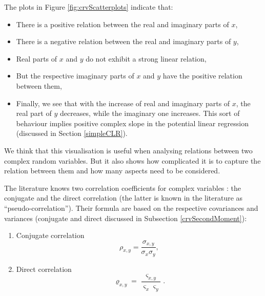 \documentclass[
]{book}
\providecommand{\tightlist}{%
  \setlength{\itemsep}{0pt}\setlength{\parskip}{0pt}}
\begin{document}
The plots in Figure \ref{fig:crvScatterplots} indicate that:

\begin{itemize}
\tightlist
\item
  There is a positive relation between the real and imaginary parts of \(x\),
\item
  There is a negative relation between the real and imaginary parts of \(y\),
\item
  Real parts of \(x\) and \(y\) do not exhibit a strong linear relation,
\item
  But the respective imaginary parts of \(x\) and \(y\) have the positive relation between them,
\item
  Finally, we see that with the increase of real and imaginary parts of \(x\), the real part of \(y\) decreases, while the imaginary one increases. This sort of behaviour implies positive complex slope in the potential linear regression (discussed in Section \ref{simpleCLR}).
\end{itemize}

We think that this visualisation is useful when analysing relations between two complex random variables. But it also shows how complicated it is to capture the relation between them and how many aspects need to be considered.

The literature knows two correlation coefficients for complex variables \citep{ref}: the conjugate and the direct correlation (the latter is known in the literature as ``pseudo-correlation''). Their formula are based on the respective covariances and variances (conjugate and direct discussed in Subsection \ref{crvSecondMoment}):

\begin{enumerate}
\def\labelenumi{\arabic{enumi}.}
\item
  Conjugate correlation
  \begin{equation}
   \rho_{x,y} = \frac{\sigma_{x,y}}{\sigma_x \sigma_y},
   \label{eq:correlationConventional}
  \end{equation}
\item
  Direct correlation
  \begin{equation}
   \varrho_{x,y} = \frac{\varsigma_{x,y}}{\varsigma_x \varsigma_y}.
   \label{eq:correlationPseudo}
  \end{equation}
\end{enumerate}
\end{document}
